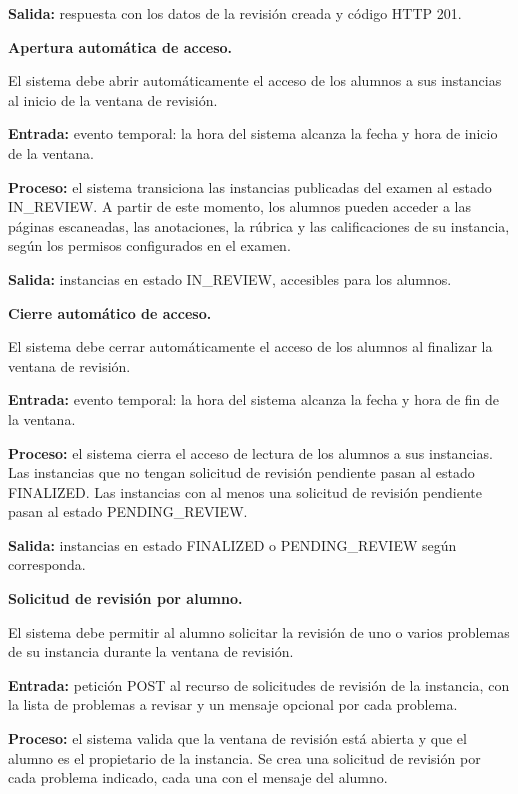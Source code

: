 \begin{functional}
\begin{functional}
    \textbf{Salida:} respuesta con los datos de la revisión creada y código HTTP 201.

    \item \textbf{Apertura automática de acceso.}

    El sistema debe abrir automáticamente el acceso de los alumnos a sus instancias al inicio de la ventana de revisión.

    \textbf{Entrada:} evento temporal: la hora del sistema alcanza la fecha y hora de inicio de la ventana.

    \textbf{Proceso:} el sistema transiciona las instancias publicadas del examen al estado IN\_REVIEW. A partir de este momento, los alumnos pueden acceder a las páginas escaneadas, las anotaciones, la rúbrica y las calificaciones de su instancia, según los permisos configurados en el examen.

    \textbf{Salida:} instancias en estado IN\_REVIEW, accesibles para los alumnos.

    \item \textbf{Cierre automático de acceso.}

    El sistema debe cerrar automáticamente el acceso de los alumnos al finalizar la ventana de revisión.

    \textbf{Entrada:} evento temporal: la hora del sistema alcanza la fecha y hora de fin de la ventana.

    \textbf{Proceso:} el sistema cierra el acceso de lectura de los alumnos a sus instancias. Las instancias que no tengan solicitud de revisión pendiente pasan al estado FINALIZED. Las instancias con al menos una solicitud de revisión pendiente pasan al estado PENDING\_REVIEW.

    \textbf{Salida:} instancias en estado FINALIZED o PENDING\_REVIEW según corresponda.

    \item \textbf{Solicitud de revisión por alumno.}

    El sistema debe permitir al alumno solicitar la revisión de uno o varios problemas de su instancia durante la ventana de revisión.

    \textbf{Entrada:} petición POST al recurso de solicitudes de revisión de la instancia, con la lista de problemas a revisar y un mensaje opcional por cada problema.

    \textbf{Proceso:} el sistema valida que la ventana de revisión está abierta y que el alumno es el propietario de la instancia. Se crea una solicitud de revisión por cada problema indicado, cada una con el mensaje del alumno.


\end{functional}
\end{functional}
